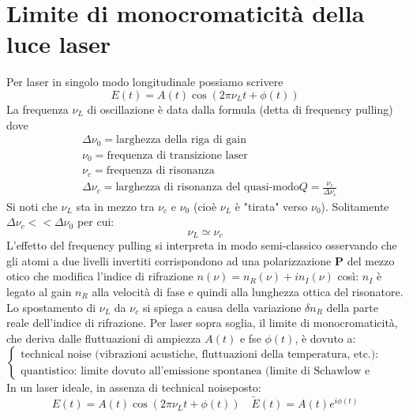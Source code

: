 \documentclass{book}
\def \*#1{\mathbf{#1}}
\def \D {\Delta}
\theoremstyle{remark}
\begin{document}
\section{Limite di monocromaticità della luce laser}
Per laser in singolo modo longitudinale possiamo scrivere
\begin{equation*}
E(t) = A(t) \cos(2\pi \nu_L t + \phi(t))
\end{equation*}
La frequenza $\nu_L$ di oscillazione è data dalla formula (detta di frequency pulling) dove
\begin{align*}
&\D \nu_0 = \text{larghezza della riga di gain}\\
&\nu_0 = \text{frequenza di transizione laser}\\
&\nu_c = \text{frequenza di risonanza}\\
&\D\nu_c = \text{larghezza di risonanza del quasi-modo} Q = \frac{\nu_c}{\D\nu_c}
\end{align*}
Si noti che $\nu_L$ sta in mezzo tra $\nu_c$ e $\nu_0$ (cioè $\nu_L$ è "tirata" verso $\nu_0$). Solitamente $\D\nu_c << \D\nu_0$ per cui:
\begin{equation*}
\nu_L \simeq \nu_c
\end{equation*}
L'effetto del frequency pulling si interpreta in modo semi-classico osservando che gli atomi a due livelli invertiti corrispondono ad una polarizzazione $\*P$ del mezzo otico che modifica l'indice di rifrazione $n(\nu) = n_R(\nu) + in_I(\nu)$ così:
$n_I$ è legato al gain $n_R$ alla velocità di fase e quindi alla lunghezza ottica del risonatore. Lo spostamento di $\nu_L$ da $\nu_c$ si spiega a causa della variazione $\delta n_R$ della parte reale dell'indice di rifrazione.
Per laser sopra soglia, il limite di monocromaticità, che deriva dalle fluttuazioni di ampiezza $A(t)$ e fse $\phi(t)$, è dovuto a:
\begin{equation*}
\begin{cases}
\text{technical noise (vibrazioni acustiche, fluttuazioni della temperatura, etc.): prevale in tutti i laser tranne che nei laser a semiconduttore}\\
\text{quantistico: limite dovuto all'emissione spontanea (limite di Schawlow e Townes) limitante nei laser a semiconduttore}
\end{cases}
\end{equation*}
In un laser ideale, in assenza di technical noiseposto:
\begin{equation*}
E(t) = A(t) \cos(2\pi\nu_Lt + \phi(t)) \quad \tilde{E}(t) = A(t) e^{i\phi(t)}
\end{equation*}
\end{document}
